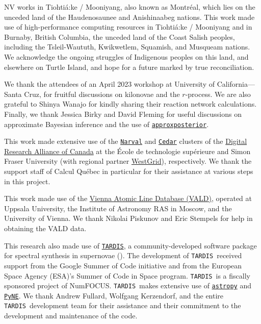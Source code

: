 \documentclass[twocolumn,twocolappendix]{aastex63}
\def\TARDIS{\texttt{TARDIS}}
\def\approxposterior{\texttt{approxposterior}}
\begin{document}
{%
\acknowledgments


NV works in Tiohti{\'a}:ke / Mooniyang, also known as Montr{\'e}al, which lies on the unceded land of the Haudenosaunee and Anishinaabeg nations. This work made use of high-performance computing resources in Tiohti{\'a}:ke / Mooniyang and in Burnaby, British Columbia, the unceded land of the Coast Salish peoples, including the Tsleil-Waututh, Kwikwetlem, Squamish, and Musqueam nations. We acknowledge the ongoing struggles of Indigenous peoples on this land, and elsewhere on Turtle Island, and hope for a future marked by true reconciliation.

We thank the attendees of an April 2023 workshop at University of California---Santa Cruz, for fruitful discussions on kilonovae and the $r$-process. We are also grateful to Shinya Wanajo for kindly sharing their reaction network calculations. Finally, we thank Jessica Birky and David Fleming for useful discussions on approximate Bayesian inference and the use of \href{https://dflemin3.github.io/approxposterior/index.html}{\approxposterior}.

This work made extensive use of the \href{https://docs.alliancecan.ca/wiki/Narval/en}{\texttt{Narval}} and \href{https://docs.alliancecan.ca/wiki/Cedar}{\texttt{Cedar}} clusters of the \href{https://alliancecan.ca/en}{Digital Research Alliance of Canada} at the {\'E}cole de technologie sup{\'e}rieure and Simon Fraser University (with regional partner \href{https://www.westgrid.ca/}{WestGrid}), respectively. We thank the support staff of Calcul Qu{\'e}bec in particular for their assistance at various steps in this project. 

This work made use of the \href{http://vald.astro.uu.se/~vald/php/vald.php}{Vienna Atomic Line Database (VALD)}, operated at Uppsala University, the Institute of Astronomy RAS in Moscow, and the University of Vienna. We thank Nikolai Piskunov and Eric Stempels for help in obtaining the VALD data.

This research also made use of \href{https://tardis-sn.github.io/tardis/index.html}{\TARDIS}, a community-developed software package for spectral synthesis in supernovae (\citealt{kerzendorf14}). The development of \TARDIS~received support from the Google Summer of Code initiative and from the European Space Agency (ESA)'s Summer of Code in Space program. \TARDIS~is a fiscally
sponsored project of NumFOCUS. \TARDIS~makes extensive use of \href{https://docs.astropy.org/en/stable/}{\texttt{astropy}} and \href{https://pyne.io/}{\texttt{PyNE}}. We thank Andrew Fullard, Wolfgang Kerzendorf, and the entire \TARDIS~development team for their assistance and their commitment to the development and maintenance of the code. 

}
\end{document}
